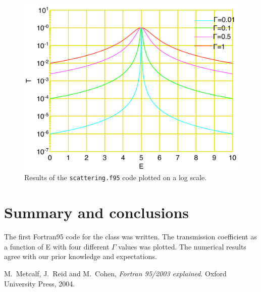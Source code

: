 \documentclass[12pt]{article}
\begin{document}
\begin{figure}[!htb]
\includegraphics[width=1.\textwidth]{logplot.pdf}
\caption{Results of the {\tt scattering.f95} code plotted on a log scale. }
\label{logscattering}
\end{figure}





\section{Summary and conclusions}

The first Fortran95 code \cite{metcalf} for the class was written. The transmission coefficient as a function of E with four different $\Gamma$ values was plotted. The numerical results agree with our prior knowledge and expectations.

\begin{thebibliography}{}


 M.\ Metcalf, J.\ Reid and M.\ Cohen, {\it Fortran 95/2003 explained}. Oxford University Press, 2004.
 

\end{thebibliography}
\end{document}
